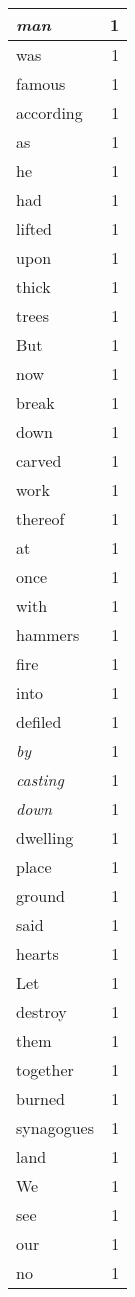 \begin{center}
\begin{longtable}{l|r}
\emph{man} & 1 \\ \hline
was & 1 \\ \hline
famous & 1 \\ \hline
according & 1 \\ \hline
as & 1 \\ \hline
he & 1 \\ \hline
had & 1 \\ \hline
lifted & 1 \\ \hline
upon & 1 \\ \hline
thick & 1 \\ \hline
trees & 1 \\ \hline
But & 1 \\ \hline
now & 1 \\ \hline
break & 1 \\ \hline
down & 1 \\ \hline
carved & 1 \\ \hline
work & 1 \\ \hline
thereof & 1 \\ \hline
at & 1 \\ \hline
once & 1 \\ \hline
with & 1 \\ \hline
hammers & 1 \\ \hline
fire & 1 \\ \hline
into & 1 \\ \hline
defiled & 1 \\ \hline
\emph{by} & 1 \\ \hline
\emph{casting} & 1 \\ \hline
\emph{down} & 1 \\ \hline
dwelling & 1 \\ \hline
place & 1 \\ \hline
ground & 1 \\ \hline
said & 1 \\ \hline
hearts & 1 \\ \hline
Let & 1 \\ \hline
destroy & 1 \\ \hline
them & 1 \\ \hline
together & 1 \\ \hline
burned & 1 \\ \hline
synagogues & 1 \\ \hline
land & 1 \\ \hline
We & 1 \\ \hline
see & 1 \\ \hline
our & 1 \\ \hline
no & 1 \\ \hline

\end{longtable}
\end{center}
